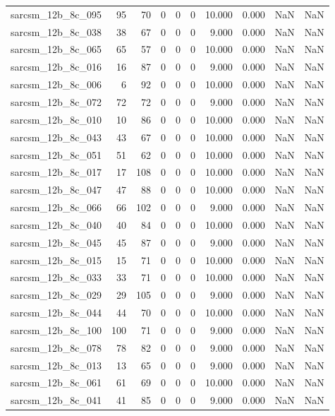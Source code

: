 \documentclass{article}
\begin{document}
\begin{longtable}{lrrrrrrrrr}
sarcsm\_12b\_8c\_095 & 95 & 70 & 0 & 0 & 0 & 10.000 & 0.000 & NaN & NaN \\
sarcsm\_12b\_8c\_038 & 38 & 67 & 0 & 0 & 0 & 9.000 & 0.000 & NaN & NaN \\
sarcsm\_12b\_8c\_065 & 65 & 57 & 0 & 0 & 0 & 10.000 & 0.000 & NaN & NaN \\
sarcsm\_12b\_8c\_016 & 16 & 87 & 0 & 0 & 0 & 9.000 & 0.000 & NaN & NaN \\
sarcsm\_12b\_8c\_006 & 6 & 92 & 0 & 0 & 0 & 10.000 & 0.000 & NaN & NaN \\
sarcsm\_12b\_8c\_072 & 72 & 72 & 0 & 0 & 0 & 9.000 & 0.000 & NaN & NaN \\
sarcsm\_12b\_8c\_010 & 10 & 86 & 0 & 0 & 0 & 10.000 & 0.000 & NaN & NaN \\
sarcsm\_12b\_8c\_043 & 43 & 67 & 0 & 0 & 0 & 10.000 & 0.000 & NaN & NaN \\
sarcsm\_12b\_8c\_051 & 51 & 62 & 0 & 0 & 0 & 10.000 & 0.000 & NaN & NaN \\
sarcsm\_12b\_8c\_017 & 17 & 108 & 0 & 0 & 0 & 10.000 & 0.000 & NaN & NaN \\
sarcsm\_12b\_8c\_047 & 47 & 88 & 0 & 0 & 0 & 10.000 & 0.000 & NaN & NaN \\
sarcsm\_12b\_8c\_066 & 66 & 102 & 0 & 0 & 0 & 9.000 & 0.000 & NaN & NaN \\
sarcsm\_12b\_8c\_040 & 40 & 84 & 0 & 0 & 0 & 10.000 & 0.000 & NaN & NaN \\
sarcsm\_12b\_8c\_045 & 45 & 87 & 0 & 0 & 0 & 9.000 & 0.000 & NaN & NaN \\
sarcsm\_12b\_8c\_015 & 15 & 71 & 0 & 0 & 0 & 10.000 & 0.000 & NaN & NaN \\
sarcsm\_12b\_8c\_033 & 33 & 71 & 0 & 0 & 0 & 10.000 & 0.000 & NaN & NaN \\
sarcsm\_12b\_8c\_029 & 29 & 105 & 0 & 0 & 0 & 9.000 & 0.000 & NaN & NaN \\
sarcsm\_12b\_8c\_044 & 44 & 70 & 0 & 0 & 0 & 10.000 & 0.000 & NaN & NaN \\
sarcsm\_12b\_8c\_100 & 100 & 71 & 0 & 0 & 0 & 9.000 & 0.000 & NaN & NaN \\
sarcsm\_12b\_8c\_078 & 78 & 82 & 0 & 0 & 0 & 9.000 & 0.000 & NaN & NaN \\
sarcsm\_12b\_8c\_013 & 13 & 65 & 0 & 0 & 0 & 9.000 & 0.000 & NaN & NaN \\
sarcsm\_12b\_8c\_061 & 61 & 69 & 0 & 0 & 0 & 10.000 & 0.000 & NaN & NaN \\
sarcsm\_12b\_8c\_041 & 41 & 85 & 0 & 0 & 0 & 9.000 & 0.000 & NaN & NaN \\

\end{longtable}
\end{document}
